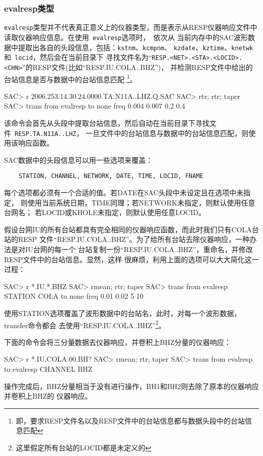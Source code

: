 \subsubsection{evalresp类型}
\verb+evalresp+类型并不代表真正意义上的仪器类型，而是表示从RESP仪器响应文件中
读取仪器响应信息。在使用~\verb+evalresp+选项时，~依次从
当前内存中的SAC波形数据中提取出各自的头段信息，包括：\verb+kstnm+、\verb+kcmpnm+、
\verb+kzdate+、\verb+kztime+、\verb+knetwk+和~\verb+locid+，然后会在当前目录下
寻找文件名为``\verb+RESP.<NET>.<STA>.<LOCID>.<CHN>+''的RESP文件(比如``RESP.IU.COLA..BHZ'')，
并检测RESP文件中给出的台站信息是否与数据中的台站信息匹配
\footnote{即，要求RESP文件名以及RESP文件中的台站信息都与数据头段中的台站信息匹配}。
\begin{SACCode}
SAC> r 2006.253.14.30.24.0000.TA.N11A..LHZ.Q.SAC
SAC> rtr; rtr; taper
SAC> trans from evalresp to none freq 0.004 0.007 0.2 0.4
\end{SACCode}
该命令会首先从头段中提取台站信息，然后自动在当前目录下寻找文件~\verb+RESP.TA.N11A..LHZ+，
一旦文件中的台站信息与数据中的台站信息匹配，则使用该响应函数。

SAC数据中的头段信息可以用一些选项来覆盖：
\begin{verbatim}
    STATION, CHANNEL, NETWORK, DATE, TIME, LOCID, FNAME
\end{verbatim}
每个选项都必须有一个合适的值。若DATE在SAC头段中未设定且在选项中未指定，
则使用当前系统日期，TIME同理；若NETWORK未指定，则默认使用任意台网名；
若LOCID或KHOLE未指定，则默认使用任意LOCID。

假设台网IU的所有台站都具有完全相同的仪器响应函数，而此时我们只有COLA台站的RESP
文件``RESP.IU.COLA..BHZ''。为了给所有台站去除仪器响应，一种办法是对IU台网的每一个
台站复制一份``RESP.IU.COLA..BHZ''，重命名，并修改RESP文件中的台站信息。显然，这样
很麻烦，利用上面的选项可以大大简化这一过程：
\begin{SACCode}
SAC> r *.IU.*.BHZ
SAC> rmean; rtr; taper
SAC> trans from evalresp STATION COLA to none freq 0.01 0.02 5 10
\end{SACCode}
使用STATION选项覆盖了波形数据中的台站名，此时，对每一个波形数据，transfer命令都会
去使用``RESP.IU.COLA..BHZ''\footnote{这里假定所有台站的LOCID都是未定义的}。

下面的命令会将三分量数据去仪器响应，并卷积上BHZ分量的仪器响应：
\begin{SACCode}
SAC> r *.IU.COLA.00.BH?
SAC> rmean; rtr; taper
SAC> trans from evalresp to evalresp CHANNEL BHZ
\end{SACCode}
操作完成后，BHZ分量相当于没有进行操作，BH1和BH2则去除了原本的仪器响应并卷积上BHZ的
仪器响应。

